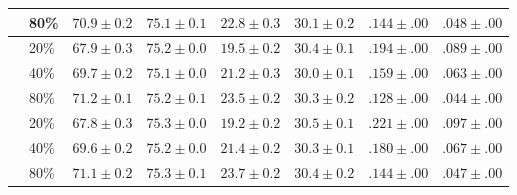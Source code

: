 \begin{center}
\begin{longtable}{llrrrrrr}
                        & 80\% & $70.9\pm0.2$ & $75.1\pm0.1$ & $22.8\pm0.3$ & $30.1\pm0.2$ & $.144\pm.00$ & $.048\pm.00$ \\
\midrule
\multirow{3}{*}{\epi{}} & 20\% & $67.9\pm0.3$ & $75.2\pm0.0$ & $19.5\pm0.2$ & $30.4\pm0.1$ & $.194\pm.00$ & $.089\pm.00$ \\
                        & 40\% & $69.7\pm0.2$ & $75.1\pm0.0$ & $21.2\pm0.3$ & $30.0\pm0.1$ & $.159\pm.00$ & $.063\pm.00$ \\
                        & 80\% & $71.2\pm0.1$ & $75.2\pm0.1$ & $23.5\pm0.2$ & $30.3\pm0.2$ & $.128\pm.00$ & $.044\pm.00$ \\
\midrule
\multirow{3}{*}{\kiw{}} & 20\% & $67.8\pm0.3$ & $75.3\pm0.0$ & $19.2\pm0.2$ & $30.5\pm0.1$ & $.221\pm.00$ & $.097\pm.00$ \\
                        & 40\% & $69.6\pm0.2$ & $75.2\pm0.0$ & $21.4\pm0.2$ & $30.3\pm0.1$ & $.180\pm.00$ & $.067\pm.00$ \\
                        & 80\% & $71.1\pm0.2$ & $75.3\pm0.1$ & $23.7\pm0.2$ & $30.4\pm0.2$ & $.144\pm.00$ & $.047\pm.00$ \\
    \bottomrule
  \end{longtable}
\end{center}

